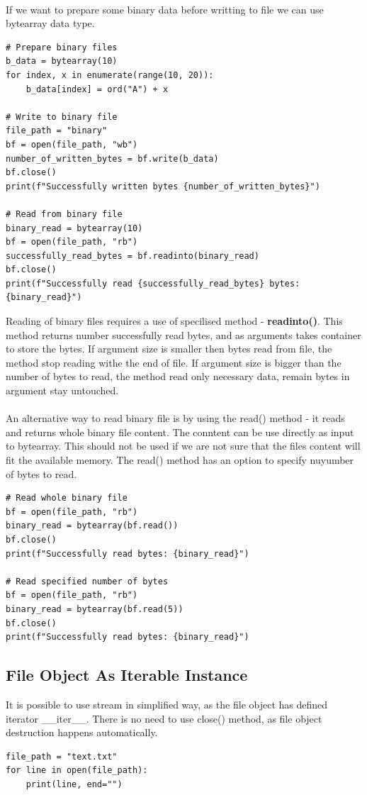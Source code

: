 \documentclass{article}
\begin{document}
\paragraph{}
If we want to prepare some binary data before writting to file we can use bytearray data type.
\begin{lstlisting}[style=pystyle]
# Prepare binary files
b_data = bytearray(10)
for index, x in enumerate(range(10, 20)):
	b_data[index] = ord("A") + x

# Write to binary file
file_path = "binary"
bf = open(file_path, "wb")
number_of_written_bytes = bf.write(b_data)
bf.close()
print(f"Successfully written bytes {number_of_written_bytes}")

# Read from binary file
binary_read = bytearray(10)
bf = open(file_path, "rb")
successfully_read_bytes = bf.readinto(binary_read)
bf.close()
print(f"Successfully read {successfully_read_bytes} bytes: {binary_read}")
\end{lstlisting}
Reading of binary files requires a use of specilised method - \textbf{readinto()}. This method returns number successfully read bytes, and as arguments takes container to store the bytes. If argument size is smaller then bytes read from file, the method stop reading withe the end of file. If argument size is bigger than the number of bytes to read, the method read only necessary data, remain bytes in argument stay untouched.
\paragraph{}
An alternative way to read binary file is by using the read() method - it reads and returns whole binary file content. The conntent can be use directly as input to bytearray. This should not be used if we are not sure that the files content will fit the available memory. The read() method has an option to specify nuyumber of bytes to read.
\begin{lstlisting}[style=pystyle]
# Read whole binary file
bf = open(file_path, "rb")
binary_read = bytearray(bf.read())
bf.close()
print(f"Successfully read bytes: {binary_read}")

# Read specified number of bytes
bf = open(file_path, "rb")
binary_read = bytearray(bf.read(5))
bf.close()
print(f"Successfully read bytes: {binary_read}")
\end{lstlisting}

\subsection{File Object As Iterable Instance}
It is possible to use stream in simplified way, as the file object has defined iterator \_\_iter\_\_. There is no need to use close() method, as file object destruction happens automatically.
\begin{lstlisting}[style=pystyle]
file_path = "text.txt"
for line in open(file_path):
    print(line, end="")
\end{lstlisting}
\end{document}
